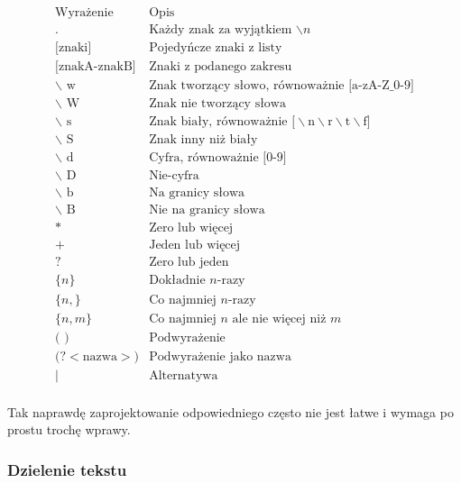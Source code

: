 \begin{center}
$$\begin{array}{ll}
\mbox{Wyrażenie} & \mbox{Opis}  \\
\hline 
\mbox{.}        & \mbox{Każdy znak za wyjątkiem $\backslash n$} \\
\mbox{[znaki]}  & \mbox{Pojedyńcze znaki z listy} \\
\mbox{[znakA-znakB]} & \mbox{Znaki z podanego zakresu} \\
\mbox{$\backslash$ w}            & \mbox{Znak tworzący słowo, równoważnie [a-zA-Z\_0-9]} \\
\mbox{$\backslash$ W}            & \mbox{Znak nie tworzący słowa} \\ 
\mbox{$\backslash$ s}            & \mbox{Znak biały, równoważnie [$\backslash$n$\backslash$r$\backslash$t$\backslash$f]} \\
\mbox{$\backslash$ S}            & \mbox{Znak inny niż biały} \\
\mbox{$\backslash$ d}            & \mbox{Cyfra, równoważnie [0-9]} \\
\mbox{$\backslash$ D}            & \mbox{Nie-cyfra} \\
\mbox{$\backslash$ b}            & \mbox{Na granicy słowa} \\
\mbox{$\backslash$ B}            & \mbox{Nie na granicy słowa} \\
\mbox{*}             & \mbox{Zero lub więcej} \\
\mbox{+}             & \mbox{Jeden lub więcej} \\
\mbox{?}             & \mbox{Zero lub jeden} \\
\mbox{$\{n\}$}       & \mbox{Dokładnie $n$-razy} \\ 
\mbox{$\{n,\}$}      & \mbox{Co najmniej $n$-razy} \\ 
\mbox{$\{n,m\}$}     & \mbox{Co najmniej $n$ ale nie więcej niż $m$}\\ 
\mbox{( )}         & \mbox{Podwyrażenie} \\
\mbox{(?$<$nazwa$>$)}  & \mbox{Podwyrażenie jako nazwa} \\
\mbox{$\vert$}         & \mbox{Alternatywa} \\ 
\end{array}$$
\end{center}

Tak naprawdę zaprojektowanie odpowiedniego często nie jest łatwe i wymaga po prostu trochę wprawy.  

\subsubsection{Dzielenie tekstu}

